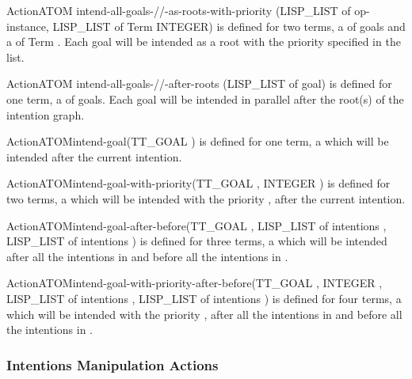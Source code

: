 \begin{typeefa}{Action}{ATOM} {intend-all-goals-//-as-roots-with-priority}
{(LISP\_LIST of op-instance, LISP\_LIST of Term INTEGER)} is defined for two
terms, a  of goals and a  of Term .  Each goal will be
intended as a root with the priority specified in the  list.
\end{typeefa}

\begin{typeefa}{Action}{ATOM} {intend-all-goals-//-after-roots} {(LISP\_LIST of
goal)} is defined for one term, a  of goals. Each goal will be intended
in parallel after the root(s) of the intention graph.
\end{typeefa}

\begin{typeefa}{Action}{ATOM}{intend-goal}{(TT\_GOAL )}
is defined for one term, a   which will be
intended after the current intention.
\end{typeefa}

\begin{typeefa}{Action}{ATOM}{intend-goal-with-priority}{(TT\_GOAL
, INTEGER )} is defined for two terms, a  
which will be intended with the priority , after the current
intention.
\end{typeefa}

\begin{typeefa}{Action}{ATOM}{intend-goal-after-before}{(TT\_GOAL
,
LISP\_LIST of intentions , LISP\_LIST of intentions )} is
defined for three terms, a   which will be intended
after all the intentions in  and before all the intentions in
.
\end{typeefa}

\begin{typeefa}{Action}{ATOM}{intend-goal-with-priority-after-before}{(TT\_GOAL , INTEGER , LISP\_LIST of intentions ,
LISP\_LIST of intentions )}
is defined for four terms, a   which will be
intended  with the priority , after all the intentions in
 and before all the intentions in .
\end{typeefa}

\subsubsection{Intentions Manipulation Actions}


